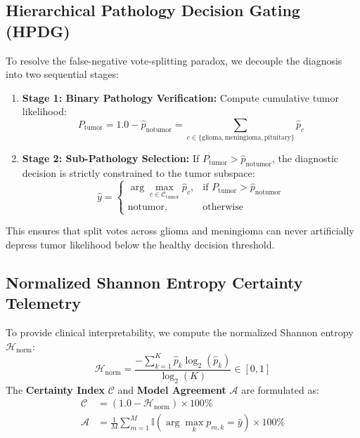 \documentclass[runningheads]{llncs}
\begin{document}
\subsection{Hierarchical Pathology Decision Gating (HPDG)}
To resolve the false-negative vote-splitting paradox, we decouple the diagnosis into two sequential stages:
\begin{enumerate}
    \item \textbf{Stage 1: Binary Pathology Verification:} Compute cumulative tumor likelihood:
    \begin{equation}
    P_{\text{tumor}} = 1.0 - \hat{p}_{\text{notumor}} = \sum_{c \in \{\text{glioma}, \text{meningioma}, \text{pituitary}\}} \hat{p}_c
    \end{equation}
    \item \textbf{Stage 2: Sub-Pathology Selection:} If $P_{\text{tumor}} > \hat{p}_{\text{notumor}}$, the diagnostic decision is strictly constrained to the tumor subspace:
    \begin{equation}
    \hat{y} = \begin{cases}
    \arg\max_{c \in \mathcal{C}_{\text{tumor}}} \hat{p}_c, & \text{if } P_{\text{tumor}} > \hat{p}_{\text{notumor}} \\
    \text{notumor}, & \text{otherwise}
    \end{cases}
    \end{equation}
\end{enumerate}
This ensures that split votes across glioma and meningioma can never artificially depress tumor likelihood below the healthy decision threshold.

\subsection{Normalized Shannon Entropy Certainty Telemetry}
To provide clinical interpretability, we compute the normalized Shannon entropy $\mathcal{H}_{\text{norm}}$:
\begin{equation}
\mathcal{H}_{\text{norm}} = \frac{-\sum_{k=1}^K \hat{p}_k \log_2(\hat{p}_k)}{\log_2(K)} \in [0, 1]
\end{equation}
The \textbf{Certainty Index} $\mathcal{C}$ and \textbf{Model Agreement} $\mathcal{A}$ are formulated as:
\begin{align}
\mathcal{C} &= (1.0 - \mathcal{H}_{\text{norm}}) \times 100\% \\
\mathcal{A} &= \frac{1}{M} \sum_{m=1}^M \mathbb{I}\left(\arg\max_k p_{m, k} = \hat{y}\right) \times 100\%
\end{align}
\end{document}
